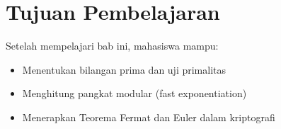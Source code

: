 \section*{Tujuan Pembelajaran}
Setelah mempelajari bab ini, mahasiswa mampu:
\begin{itemize}
\item Menentukan bilangan prima dan uji primalitas
\item Menghitung pangkat modular (fast exponentiation)
\item Menerapkan Teorema Fermat dan Euler dalam kriptografi
\end{itemize}
